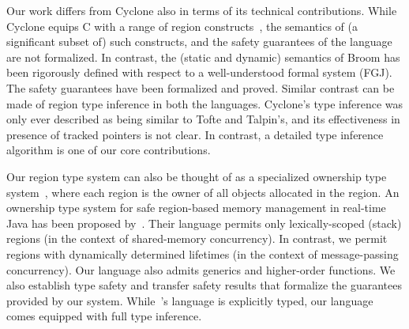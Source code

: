 Our work differs from Cyclone also in terms of its technical
contributions. While Cyclone equips C with a range of region
constructs~\cite{cycloneSCP}, the semantics of (a significant subset
of) such constructs, and the safety guarantees of the language are not
formalized. In contrast, the (static and dynamic) semantics of Broom
has been rigorously defined with respect to a well-understood formal
system (FGJ). The safety guarantees have been formalized and proved.
Similar contrast can be made of region type inference in both the languages.
Cyclone's type inference was only ever described as being similar to
Tofte and Talpin's, and its effectiveness in presence of tracked
pointers is not clear.
In contrast, a detailed type inference algorithm is one of our core contributions.

Our region type system can also be thought of as a specialized
ownership type system~\cite{OwnershipSurvey}, where each region is the
owner of all objects allocated in the region.
%
An ownership type system for safe region-based memory management in
real-time Java has been proposed by~\cite{MIT03}.  
Their language permits only lexically-scoped (stack) regions
(in the context of shared-memory concurrency). In contrast, we permit
regions with dynamically determined lifetimes (in the context of message-passing concurrency).
Our language also admits generics and higher-order functions.
We also establish type safety and transfer safety results that
formalize the guarantees provided by our system. While~\cite{MIT03}'s
language is explicitly typed, our language comes equipped with full
type inference.


